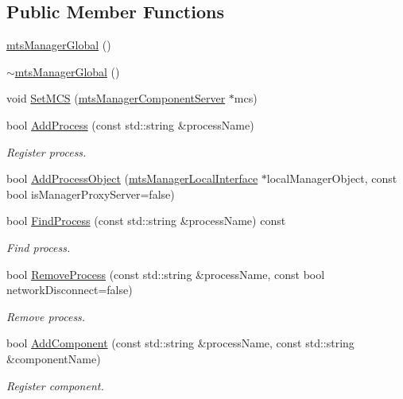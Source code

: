 \subsection*{Public Member Functions}
\begin{DoxyCompactItemize}
\item 
\hyperlink{classmts_manager_global_abd0f3829c71d3e3c1f29fc048d9047be}{mts\-Manager\-Global} ()
\item 
\hyperlink{classmts_manager_global_ac679e410e25ca54006e4893cb4feb9b5}{$\sim$mts\-Manager\-Global} ()
\item 
void \hyperlink{classmts_manager_global_a25180a6b4c13081af290de27cca9dc18}{Set\-M\-C\-S} (\hyperlink{classmts_manager_component_server}{mts\-Manager\-Component\-Server} $\ast$mcs)
\item 
bool \hyperlink{classmts_manager_global_ad2133b03d5c9cad83613cfd9f94b33c4}{Add\-Process} (const std\-::string \&process\-Name)
\begin{DoxyCompactList}\small\item\em Register process. \end{DoxyCompactList}\item 
bool \hyperlink{classmts_manager_global_a16df0096e52ff60e1dadafcde7a75fef}{Add\-Process\-Object} (\hyperlink{classmts_manager_local_interface}{mts\-Manager\-Local\-Interface} $\ast$local\-Manager\-Object, const bool is\-Manager\-Proxy\-Server=false)
\item 
bool \hyperlink{classmts_manager_global_a4a62c2854055d41938a6b8e65c0193da}{Find\-Process} (const std\-::string \&process\-Name) const 
\begin{DoxyCompactList}\small\item\em Find process. \end{DoxyCompactList}\item 
bool \hyperlink{classmts_manager_global_aabe689a2366312fb41e4f559241c34f4}{Remove\-Process} (const std\-::string \&process\-Name, const bool network\-Disconnect=false)
\begin{DoxyCompactList}\small\item\em Remove process. \end{DoxyCompactList}\item 
bool \hyperlink{classmts_manager_global_a7ea69577859e7ee2790adb4bc69c589c}{Add\-Component} (const std\-::string \&process\-Name, const std\-::string \&component\-Name)
\begin{DoxyCompactList}\small\item\em Register component. \end{DoxyCompactList}\item 

\end{DoxyCompactItemize}
